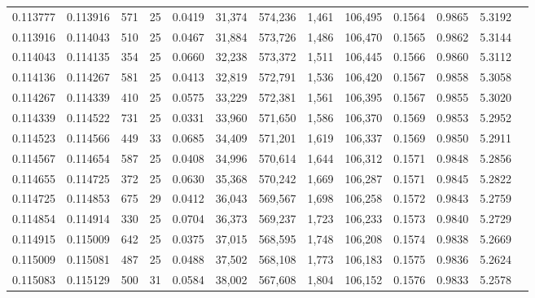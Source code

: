 \begin{tabular}{rrrrrrrrrrrrr}
0.113777 & 0.113916 & 571 &  25 &                                     0.0419 &  31,374 & 574,236 &   1,461 & 106,495 & 0.1564 & 0.9865 & 5.3192 \\
0.113916 & 0.114043 & 510 &  25 &                                     0.0467 &  31,884 & 573,726 &   1,486 & 106,470 & 0.1565 & 0.9862 & 5.3144 \\
0.114043 & 0.114135 & 354 &  25 &                                     0.0660 &  32,238 & 573,372 &   1,511 & 106,445 & 0.1566 & 0.9860 & 5.3112 \\
0.114136 & 0.114267 & 581 &  25 &                                     0.0413 &  32,819 & 572,791 &   1,536 & 106,420 & 0.1567 & 0.9858 & 5.3058 \\
0.114267 & 0.114339 & 410 &  25 &                                     0.0575 &  33,229 & 572,381 &   1,561 & 106,395 & 0.1567 & 0.9855 & 5.3020 \\
0.114339 & 0.114522 & 731 &  25 &                                     0.0331 &  33,960 & 571,650 &   1,586 & 106,370 & 0.1569 & 0.9853 & 5.2952 \\
0.114523 & 0.114566 & 449 &  33 &                                     0.0685 &  34,409 & 571,201 &   1,619 & 106,337 & 0.1569 & 0.9850 & 5.2911 \\
0.114567 & 0.114654 & 587 &  25 &                                     0.0408 &  34,996 & 570,614 &   1,644 & 106,312 & 0.1571 & 0.9848 & 5.2856 \\
0.114655 & 0.114725 & 372 &  25 &                                     0.0630 &  35,368 & 570,242 &   1,669 & 106,287 & 0.1571 & 0.9845 & 5.2822 \\
0.114725 & 0.114853 & 675 &  29 &                                     0.0412 &  36,043 & 569,567 &   1,698 & 106,258 & 0.1572 & 0.9843 & 5.2759 \\
0.114854 & 0.114914 & 330 &  25 &                                     0.0704 &  36,373 & 569,237 &   1,723 & 106,233 & 0.1573 & 0.9840 & 5.2729 \\
0.114915 & 0.115009 & 642 &  25 &                                     0.0375 &  37,015 & 568,595 &   1,748 & 106,208 & 0.1574 & 0.9838 & 5.2669 \\
0.115009 & 0.115081 & 487 &  25 &                                     0.0488 &  37,502 & 568,108 &   1,773 & 106,183 & 0.1575 & 0.9836 & 5.2624 \\
0.115083 & 0.115129 & 500 &  31 &                                     0.0584 &  38,002 & 567,608 &   1,804 & 106,152 & 0.1576 & 0.9833 & 5.2578 \\

\end{tabular}
